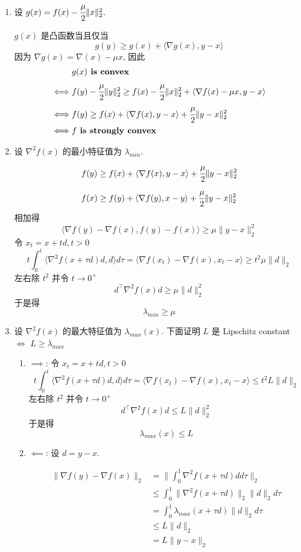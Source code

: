 \documentclass[11pt,letter,notitlepage]{article}
\theoremstyle{definition}
\begin{document}
\begin{solution}
	\begin{enumerate}
		\item 设 $g(x)=f(x)-\cfrac{\mu}{2}\|x\|_2^2$.

		      $g(x)$ 是凸函数当且仅当
		      $$g(y)\geq g(x)+\langle \nabla g(x),y-x \rangle$$
		      因为 $\nabla g(x)=\nabla (x)-\mu x$, 因此
		      $$\begin{aligned}
				           & g(x) \textbf{ is convex}                                                                             \\
				      \iff & f(y)-\cfrac{\mu}{2}\|y\|_2^2 \geq f(x)-\cfrac{\mu}{2}\|x\|_2^2+\langle \nabla f(x)-\mu x,y-x \rangle \\
				      \iff & f(y) \geq f(x)+\langle \nabla f(x),y-x \rangle +\cfrac{\mu}{2}\|y-x\|_2^2                            \\
				      \iff & f \textbf{ is strongly convex}
			      \end{aligned}$$
		\item 设 $\nabla^2 f(x)$ 的最小特征值为 $\lambda_{min}$.
		      $$ f(y) \geq f(x)+\langle \nabla f(x),y-x \rangle +\cfrac{\mu}{2}\|y-x\|_2^2$$
		      $$ f(x) \geq f(y)+\langle \nabla f(y),x-y \rangle +\cfrac{\mu}{2}\|y-x\|_2^2$$
		      相加得$$\langle\nabla f(y)-\nabla f(x),f(y)-f(x) \rangle\geq\mu \|y-x\|_2^2$$
		      令 $x_t=x+td, t>0$
		      $$t\int_0^t \langle \nabla^2 f(x+\tau d)d,d \rangle d\tau=\langle \nabla f(x_t)-\nabla f(x),x_t-x \rangle\geq t^2\mu\|d\|_2$$
		      左右除 $t^2$ 并令 $t\to0^+$
		      $$d^\top \nabla^2 f(x) d\geq \mu \|d\|_2^2$$
		      于是得
		      $$\lambda_{min}\geq\mu$$
		\item 设 $\nabla^2 f(x)$ 的最大特征值为 $\lambda_{max}(x)$.
		      下面证明 $L$ 是 Lipschitz constant $\iff$ $L\geq \lambda_{max}$
		      \begin{enumerate}
			      \item $\implies$: 令 $x_t=x+td, t>0$
			            $$t\int_0^t \langle \nabla^2 f(x+\tau d)d,d \rangle d\tau=\langle \nabla f(x_t)-\nabla f(x),x_t-x \rangle\leq t^2L\|d\|_2$$
			            左右除 $t^2$ 并令 $t\to0^+$
			            $$d^\top \nabla^2 f(x) d\leq L \|d\|_2^2$$
			            于是得
			            $$\lambda_{max}(x)\leq L$$
			      \item $\impliedby$: 设 $d=y-x$.

			            $$\begin{aligned}
					            \|\nabla f(y)-\nabla f(x)\|_2
					             & =\|\int_0^1 \nabla^2 f(x+\tau d)d d\tau\|_2           \\
					             & \leq\int_0^1 \|\nabla^2 f(x+\tau d)\|_2 \|d\|_2 d\tau \\
					             & =\int_0^1 \lambda_{max}(x+\tau d) \|d\|_2 d\tau       \\
					             & \leq L\|d\|_2                                         \\
					             & =L \|y-x\|_2
				            \end{aligned}$$
		      \end{enumerate}
	\end{enumerate}
\end{solution}
\end{document}
